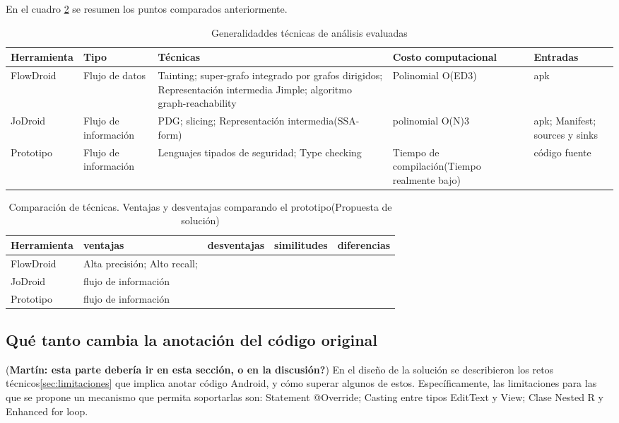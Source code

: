 En el cuadro \ref{tab:comparacion} se resumen los puntos comparados
anteriormente.
\begin{table}[H]
\begin{center}
\small\addtolength{\tabcolsep}{-3pt}
\caption{Generalidaddes técnicas de análisis evaluadas}
\label{tab:comparacion}
\begin{tabular}{|p{}|p{}|p{5cm}|p{2cm}|p{2cm}|}
	\hline
	\textbf{Herramienta} & \textbf{Tipo} & \textbf{Técnicas} & \textbf{Costo
	computacional} & \textbf{ Entradas} \\
	\hline
	FlowDroid & Flujo de datos & 
	Tainting; super-grafo integrado por grafos dirigidos; Representación intermedia
	Jimple; algoritmo graph-reachability & Polinomial
	O(ED3)\cite{Graph-reachability} & apk\\
	\hline
	JoDroid & Flujo de información & PDG; slicing; Representación intermedia(SSA-
	form) & polinomial O(N)3\cite{FCO-PDG} & apk; Manifest; sources y sinks
	\\
	\hline
	Prototipo & Flujo de información  & Lenguajes tipados de seguridad; Type
	checking & Tiempo de compilación(Tiempo realmente bajo) & código fuente
	\\
	\hline
\end{tabular}
\end{center}
\end{table}	


\begin{table}[H]
\begin{center}
\small\addtolength{\tabcolsep}{-3pt}
\caption{Comparación de técnicas.\newline
Ventajas y desventajas comparando el prototipo(Propuesta de solución)}
\label{tab:comparacion}
\begin{tabular}{|p{}|p{2cm}|p{4cm}|p{}|p{}|}
	\hline
	\textbf{Herramienta} & \textbf{ventajas } & \textbf{desventajas} 
	& \textbf{similitudes} & \textbf{diferencias}\\
	\hline
	FlowDroid 
	& Alta precisión; Alto recall;  &
	 & & \\
	\hline
	JoDroid & flujo de información & & & \\ 
	\hline
	Prototipo & flujo de información  & & & \\ 
	\hline
\end{tabular}
\end{center}
\end{table}	


\subsection{Qué tanto cambia la anotación del código original}
(\textbf{Martín: esta parte debería ir en esta sección, o en la
discusión?})\newline 
En el diseño de la solución se describieron los retos
técnicos\ref{sec:limitaciones} que implica anotar código Android, y cómo superar
algunos de estos. Específicamente, las limitaciones para las que se propone un
mecanismo que permita soportarlas son: Statement @Override; Casting entre tipos
EditText y View; Clase Nested R y Enhanced for loop.

